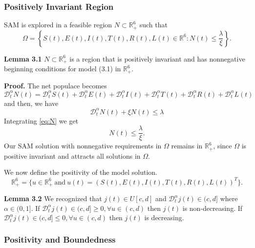 \documentclass[10pt]{article}
\newcommand{\CD}{\mathcal{D}}
\begin{document}
	\subsubsection{Positively Invariant Region}
	
	SAM is explored in a feasible region $N \subset \mathbb{R}_{+}^{6}$ such that 
	\begin{equation}
		\Omega = \left\{ S(t),E(t),I(t),T(t),R(t), L(t)\in \mathbb{R}^{6} : N(t) \leq \frac{\lambda}{\xi} \right\}.
		\label{eq:region}
	\end{equation}
	
	\textbf{Lemma 3.1} $N \subset \mathbb{R}_{+}^{6}$ is a region that is positively invariant and has nonnegative beginning conditions for model (3.1) in $\mathbb{R}_{+}^{6}$.
	
	\textbf{Proof.} The net populace becomes
	\begin{equation}
		\CD_{t}^{\alpha} N(t) = \CD_{t}^{\alpha} S(t) + \CD_{t}^{\alpha} E(t) + \CD_{t}^{\alpha} I(t) + \CD_{t}^{\alpha} T(t) + \CD_{t}^{\alpha} R(t) + \CD_{t}^{\alpha} L(t)
	\end{equation}
	and then, we have 
	\begin{equation}
		\CD_{t}^{\alpha} N(t) + \xi N(t) \leq \lambda
		\label{eq:N}
	\end{equation}
	Integrating \eqref{eq:N} we get 
	\begin{equation}
		N(t) \leq \frac{\lambda}{\xi}.
		\label{eq:Nbound}
	\end{equation}
	Our SAM solution with nonnegative requirements in $\Omega$ remains in $\mathbb{R}_{+}^{6}$, since $\Omega$ is positive invariant and attracts all solutions in $\Omega$.
	
	We now define the positivity of the model solution.
	\begin{equation}
		\mathbb{R}_{+}^{6} = \{ u\in \mathbb{R}_{+}^{6}\ \text{and}\ u(t) = (S(t),E(t),I(t),T(t),R(t),L(t))^{T} \}.
		\label{eq:R6}
	\end{equation}
	
	\textbf{Lemma 3.2} We recognized that $j(t)\in U[c,d]$ and $\CD_{t}^{\alpha} j(t)\in (c,d]$ where $\alpha \in (0,1]$. If $\CD_{t}^{\alpha} j(t)\in (c,d] \geq 0,\forall u \in (c,d)$ then $j(t)$ is non-decreasing. If $\CD_{t}^{\alpha} j(t)\in (c,d] \leq 0,\forall u \in (c,d)$ then $j(t)$ is decreasing.
	
	\subsubsection{Positivity and Boundedness}
	
\end{document}
